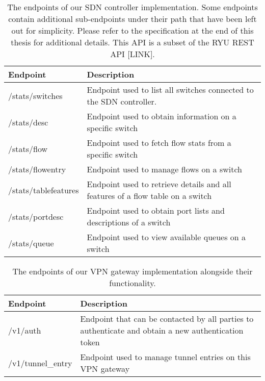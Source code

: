 \begin{table}[htp]
    \begin{tabularx}{\textwidth}{ |l|X| }
        \hline
        \textbf{Endpoint} & \textbf{Description} \\
        \hline
         /stats/switches & Endpoint used to list all switches connected to the SDN controller. \\
         /stats/desc & Endpoint used to obtain information on a specific switch \\
        \hline
         /stats/flow & Endpoint used to fetch flow stats from a specific switch \\
         /stats/flowentry & Endpoint used to manage flows on a switch \\
         /stats/tablefeatures & Endpoint used to retrieve details and all features of a flow table on a switch \\
         /stats/portdesc & Endpoint used to obtain port lists and descriptions of a switch \\
         /stats/queue & Endpoint used to view available queues on a switch \\
        \hline
    \end{tabularx}
    \caption{The endpoints of our SDN controller implementation. Some endpoints contain additional sub-endpoints under their path that have been left out for simplicity. Please refer to the specification at the end of this thesis for additional details. This API is a subset of the RYU REST API [LINK].}
    \label{table:controller}
\end{table}

\begin{table}[htp]
    \begin{tabularx}{\textwidth}{ |l|X| }
        \hline
        \textbf{Endpoint} & \textbf{Description} \\
        \hline
         /v1/auth & Endpoint that can be contacted by all parties to authenticate and obtain a new authentication token \\
        \hline
         /v1/tunnel\_entry & Endpoint used to manage tunnel entries on this VPN gateway \\
        \hline
    \end{tabularx}
    \caption{The endpoints of our VPN gateway implementation alongside their functionality.}
    \label{table:vpn_gateway}
\end{table}


